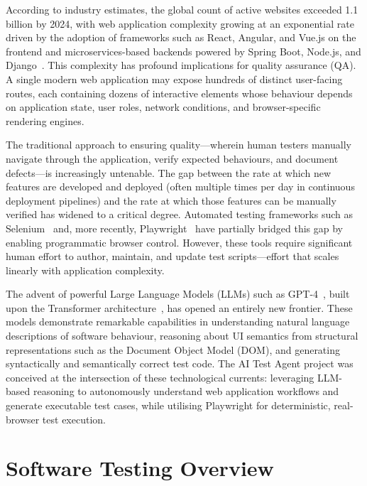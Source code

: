 According to industry estimates, the global count of active websites exceeded 1.1 billion by 2024, with web application complexity growing at an exponential rate driven by the adoption of frameworks such as React, Angular, and Vue.js on the frontend and microservices-based backends powered by Spring Boot, Node.js, and Django~\cite{playwright2024}. This complexity has profound implications for quality assurance (QA). A single modern web application may expose hundreds of distinct user-facing routes, each containing dozens of interactive elements whose behaviour depends on application state, user roles, network conditions, and browser-specific rendering engines.

The traditional approach to ensuring quality---wherein human testers manually navigate through the application, verify expected behaviours, and document defects---is increasingly untenable. The gap between the rate at which new features are developed and deployed (often multiple times per day in continuous deployment pipelines) and the rate at which those features can be manually verified has widened to a critical degree. Automated testing frameworks such as Selenium~\cite{selenium2004} and, more recently, Playwright~\cite{playwright2024} have partially bridged this gap by enabling programmatic browser control. However, these tools require significant human effort to author, maintain, and update test scripts---effort that scales linearly with application complexity.

The advent of powerful Large Language Models (LLMs) such as GPT-4~\cite{openai2023gpt4}, built upon the Transformer architecture~\cite{vaswani2017attention}, has opened an entirely new frontier. These models demonstrate remarkable capabilities in understanding natural language descriptions of software behaviour, reasoning about UI semantics from structural representations such as the Document Object Model (DOM), and generating syntactically and semantically correct test code. The AI Test Agent project was conceived at the intersection of these technological currents: leveraging LLM-based reasoning to autonomously understand web application workflows and generate executable test cases, while utilising Playwright for deterministic, real-browser test execution.


\section{Software Testing Overview}
\label{sec:testing_overview}

